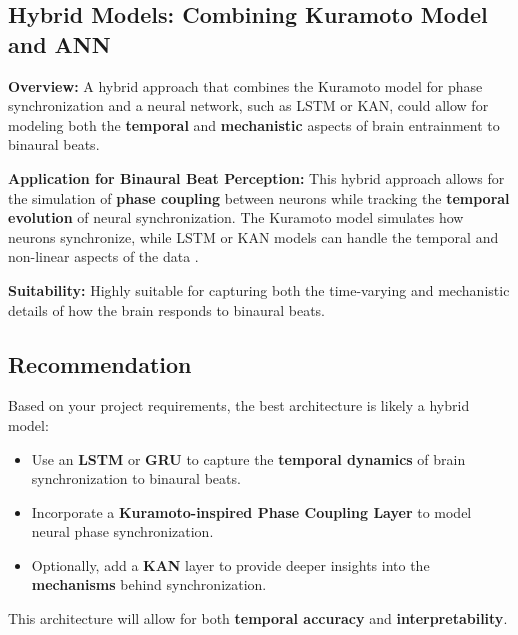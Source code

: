 \documentclass{article}
\begin{document}
\subsection{Hybrid Models: Combining Kuramoto Model and ANN}

\textbf{Overview:} A hybrid approach that combines the Kuramoto model for phase synchronization and a neural network, such as LSTM or KAN, could allow for modeling both the \textbf{temporal} and \textbf{mechanistic} aspects of brain entrainment to binaural beats.

\textbf{Application for Binaural Beat Perception:} This hybrid approach allows for the simulation of \textbf{phase coupling} between neurons while tracking the \textbf{temporal evolution} of neural synchronization. The Kuramoto model simulates how neurons synchronize, while LSTM or KAN models can handle the temporal and non-linear aspects of the data \cite{kuramoto1975self}.

\textbf{Suitability:} Highly suitable for capturing both the time-varying and mechanistic details of how the brain responds to binaural beats.

\subsection{Recommendation}

Based on your project requirements, the best architecture is likely a hybrid model:
\begin{itemize}
    \item Use an \textbf{LSTM} or \textbf{GRU} to capture the \textbf{temporal dynamics} of brain synchronization to binaural beats.
    \item Incorporate a \textbf{Kuramoto-inspired Phase Coupling Layer} to model neural phase synchronization.
    \item Optionally, add a \textbf{KAN} layer to provide deeper insights into the \textbf{mechanisms} behind synchronization.
\end{itemize}

This architecture will allow for both \textbf{temporal accuracy} and \textbf{interpretability}.

\newpage


 
\end{document}
